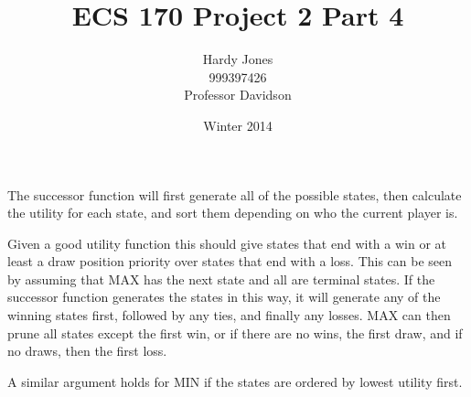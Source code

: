 \documentclass[12pt,letterpaper]{article}
\title{ECS 170 Project 2 Part 4\vspace{-2ex}}
\author{Hardy Jones\\
        999397426\\
        Professor Davidson\vspace{-2ex}}
\date{Winter 2014}
\begin{document}
  \maketitle




  The successor function will first generate all of the possible states,
  then calculate the utility for each state,
  and sort them depending on who the current player is.

  Given a good utility function this should give states that end with a win or at least a draw position priority over states that end with a loss.
  This can be seen by assuming that MAX has the next state and all are terminal states.
  If the successor function generates the states in this way, it will generate any of the winning states first, followed by any ties, and finally any losses.
  MAX can then prune all states except the first win, or if there are no wins, the first draw, and if no draws, then the first loss.

  A similar argument holds for MIN if the states are ordered by lowest utility first.
\end{document}
